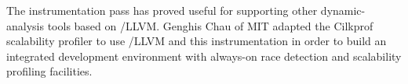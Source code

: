 The instrumentation pass has proved useful for supporting other
dynamic-analysis tools based on \tapir/LLVM.  Genghis Chau of MIT
adapted the Cilkprof scalability profiler \cite{SchardlKuLe15} to use
\tapir/LLVM and this instrumentation in order to build an integrated
development environment with always-on race detection and scalability
profiling facilities.




